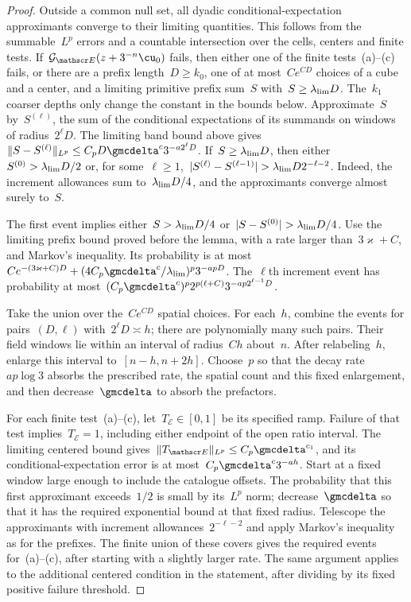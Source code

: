 \documentclass[11pt]{amsart}
\begin{document}
\begin{proof}
Outside a common null set, all dyadic conditional-expectation approximants converge to their limiting quantities. This follows from the summable~$L^p$ errors and a countable intersection over the cells, centers and finite tests. If~$\mathcal G_{\mathscr E}(z+3^{-n}\cu_0)$ fails, then either one of the finite tests~(a)--(c) fails, or there are a prefix length~$D\geq k_0$, one of at most~$Ce^{CD}$ choices of a cube and a center, and a limiting primitive prefix sum~$S$ with~$S\geq\lambda_{\rm lim}D$. The~$k_1$ coarser depths only change the constant in the bounds below. Approximate~$S$ by~$S^{(\ell)}$, the sum of the conditional expectations of its summands on windows of radius~$2^\ell D$. The limiting band bound above gives~$\|S-S^{(\ell)}\|_{L^p}\leq C_pD\gmcdelta^c3^{-a2^\ell D}$. If~$S\geq\lambda_{\rm lim}D$, then either~$S^{(0)}>\lambda_{\rm lim}D/2$ or, for some~$\ell\geq1$,~$|S^{(\ell)}-S^{(\ell-1)}|>\lambda_{\rm lim}D2^{-\ell-2}$. Indeed, the increment allowances sum to~$\lambda_{\rm lim}D/4$, and the approximants converge almost surely to~$S$.

\smallskip

The first event implies either~$S>\lambda_{\rm lim}D/4$ or~$|S-S^{(0)}|>\lambda_{\rm lim}D/4$. Use the limiting prefix bound proved before the lemma, with a rate larger than~$3\varkappa+C$, and Markov's inequality. Its probability is at most~$Ce^{-(3\varkappa+C)D}+(4C_p\gmcdelta^c/\lambda_{\rm lim})^p3^{-apD}$. The~$\ell$th increment event has probability at most~$(C_p\gmcdelta^c)^p2^{p(\ell+C)}3^{-ap2^{\ell-1}D}$.

\smallskip

Take the union over the~$Ce^{CD}$ spatial choices. For each~$h$, combine the events for pairs~$(D,\ell)$ with~$2^\ell D\asymp h$; there are polynomially many such pairs. Their field windows lie within an interval of radius~$Ch$ about~$n$. After relabeling~$h$, enlarge this interval to~$[n-h,n+2h]$. Choose~$p$ so that the decay rate~$ap\log3$ absorbs the prescribed rate, the spatial count and this fixed enlargement, and then decrease~$\gmcdelta$ to absorb the prefactors.

\smallskip

For each finite test~(a)--(c), let~$T_{\mathscr E}\in[0,1]$ be its specified ramp. Failure of that test implies~$T_{\mathscr E}=1$, including either endpoint of the open ratio interval. The limiting centered bound gives~$\|T_{\mathscr E}\|_{L^p}\leq C_p\gmcdelta^{c_1}$, and its conditional-expectation error is at most~$C_p\gmcdelta^c3^{-ah}$. Start at a fixed window large enough to include the catalogue offsets. The probability that this first approximant exceeds~$1/2$ is small by its~$L^p$ norm; decrease~$\gmcdelta$ so that it has the required exponential bound at that fixed radius. Telescope the approximants with increment allowances~$2^{-\ell-2}$ and apply Markov's inequality as for the prefixes. The finite union of these covers gives the required events for~(a)--(c), after starting with a slightly larger rate. The same argument applies to the additional centered condition in the statement, after dividing by its fixed positive failure threshold.
\end{proof}
\end{document}
